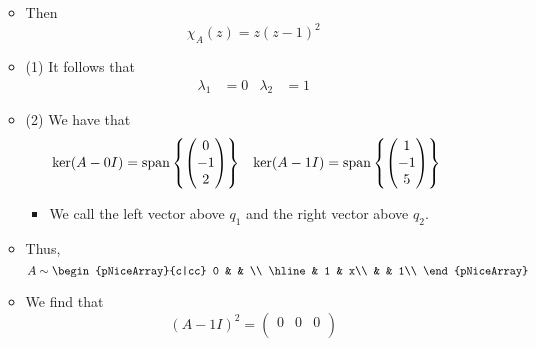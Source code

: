 \documentclass[../notes.tex]{subfiles}
\begin{document}
\begin{itemize}
\begin{itemize}
\begin{equation*}
        \end{equation*}
        \item Then
        \begin{equation*}
            \chi_A(z) = z(z-1)^2
        \end{equation*}
        \item (1) It follows that
        \begin{align*}
            \lambda_1 &= 0&
            \lambda_2 &= 1
        \end{align*}
        \item (2) We have that
        \begin{align*}
            \ker(A-0I) &= \operatorname{span}\left\{
                \begin{pmatrix}
                    0\\
                    -1\\
                    2\\
                \end{pmatrix}
            \right\}&
            \ker(A-1I) &= \operatorname{span}\left\{
                \begin{pmatrix}
                    1\\
                    -1\\
                    5\\
                \end{pmatrix}
            \right\}
        \end{align*}
        \begin{itemize}
            \item We call the left vector above $q_1$ and the right vector above $q_2$.
        \end{itemize}
        \item Thus,
        \begin{equation*}
            A \sim
            \begin{pNiceArray}{c|cc}
                0 &  & \\
                \hline
                 & 1 & x\\
                 &  & 1\\
            \end{pNiceArray}
        \end{equation*}
        \item We find that
        \begin{equation*}
            (A-1I)^2 =
            \begin{pmatrix}
                0 & 0 & 0\\

\end{pmatrix}
\end{equation*}
\end{itemize}
\end{itemize}
\end{document}
